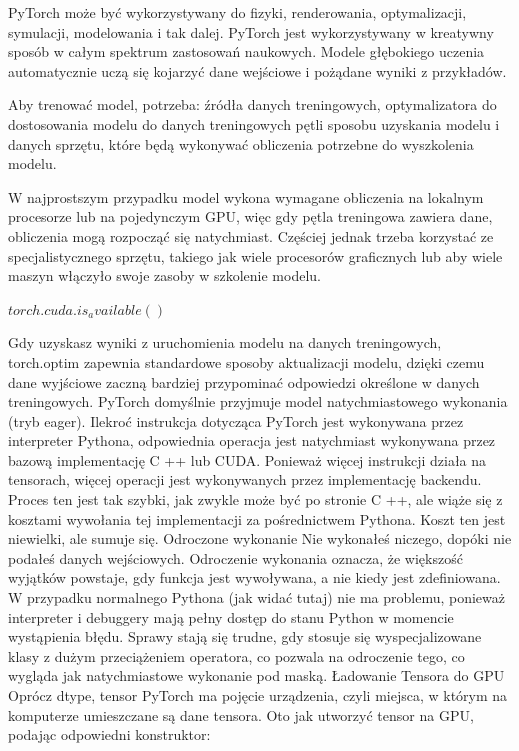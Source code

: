 \documentclass[brudnopis]{xmgr}
\begin{document}
PyTorch może być wykorzystywany do fizyki, renderowania, optymalizacji, symulacji, modelowania i tak dalej. PyTorch jest wykorzystywany w kreatywny sposób w całym spektrum zastosowań naukowych. Modele głębokiego uczenia automatycznie uczą się kojarzyć dane wejściowe i pożądane wyniki z przykładów.

Aby trenować model, potrzeba:
źródła danych treningowych, 
optymalizatora do dostosowania modelu do danych treningowych 
pętli  
sposobu uzyskania modelu i danych sprzętu, które będą wykonywać obliczenia potrzebne do wyszkolenia modelu.

W najprostszym przypadku model wykona wymagane obliczenia na lokalnym procesorze lub na pojedynczym GPU, więc gdy pętla treningowa zawiera dane, obliczenia mogą rozpocząć się natychmiast. Częściej jednak trzeba korzystać ze specjalistycznego sprzętu, takiego jak wiele procesorów graficznych lub aby wiele maszyn włączyło swoje zasoby w szkolenie modelu. 

$torch.cuda.is_available()$

Gdy uzyskasz wyniki z uruchomienia modelu na danych treningowych, torch.optim zapewnia standardowe sposoby aktualizacji modelu, dzięki czemu dane wyjściowe zaczną bardziej przypominać odpowiedzi określone w danych treningowych.
PyTorch domyślnie przyjmuje model natychmiastowego wykonania (tryb eager).
 Ilekroć instrukcja dotycząca PyTorch jest wykonywana przez interpreter Pythona, odpowiednia operacja jest natychmiast wykonywana przez bazową implementację C ++ lub CUDA. Ponieważ więcej instrukcji działa na tensorach, więcej operacji jest wykonywanych przez implementację backendu. Proces ten jest tak szybki, jak zwykle może być po stronie C ++, ale wiąże się z kosztami wywołania tej implementacji za pośrednictwem Pythona. Koszt ten jest niewielki, ale sumuje się.
Odroczone wykonanie
Nie wykonałeś niczego, dopóki nie podałeś danych wejściowych. Odroczenie wykonania oznacza, że większość wyjątków powstaje, gdy funkcja jest wywoływana, a nie kiedy jest zdefiniowana. W przypadku normalnego Pythona (jak widać tutaj) nie ma problemu, ponieważ interpreter i debuggery mają pełny dostęp do stanu Python w momencie wystąpienia błędu.
Sprawy stają się trudne, gdy stosuje się wyspecjalizowane klasy z dużym przeciążeniem operatora, co pozwala na odroczenie tego, co wygląda jak natychmiastowe wykonanie pod maską.  Ładowanie Tensora do GPU
Oprócz dtype, tensor PyTorch ma pojęcie urządzenia, czyli miejsca, w którym na komputerze umieszczane są dane tensora. 
Oto jak utworzyć tensor na GPU, podając odpowiedni konstruktor:
\end{document}
